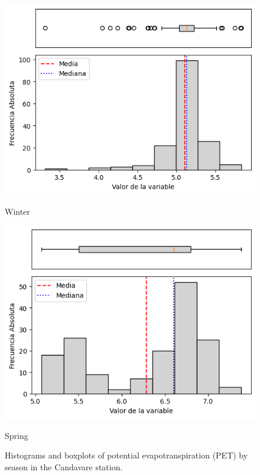 \begin{figure}[htbp]
\begin{minipage}{0.30\textwidth}
  \includegraphics[width=\linewidth]{resultados/por_estacion_del_anio/boxplot_clases_por_estacion/Candavare/PET_HistBoxplot_Winter.png}
  \caption*{Winter}
\end{minipage}
\hfill
\begin{minipage}{0.30\textwidth}
  \includegraphics[width=\linewidth]{resultados/por_estacion_del_anio/boxplot_clases_por_estacion/Candavare/PET_HistBoxplot_Spring.png}
  \caption*{Spring}
\end{minipage}
\caption{Histograms and boxplots of potential evapotranspiration (PET) by season in the Candavare station.}
\label{fig:candavare_pet_hist}
\end{figure}

